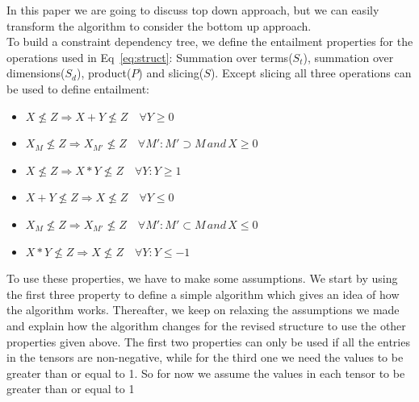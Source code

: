 \documentclass{article}
\begin{document}
In this paper we are going to discuss top down approach, but we can easily transform the algorithm to consider the bottom up approach. 
\\
To build a constraint dependency tree, we define the entailment properties for the operations used in Eq~\ref{eq:struct}: Summation over terms($S_t$), summation over dimensions($S_d$), product($P$) and slicing($S$). Except slicing all three operations can be used to define entailment:
\begin{itemize}
\item $X \not\le Z \Rightarrow X + Y \not\le Z \quad \forall Y \geq 0$
\item $X_{M} \not\le Z \Rightarrow X_{M'} \not\le Z \quad \forall M': M' \supset M \, and \, X \geq 0$
\item $X \not\le Z \Rightarrow X * Y \not\le Z \quad \forall Y: Y \geq 1$
\item $X + Y \not\le Z \Rightarrow X \not\le Z \quad \forall Y \le 0$
\item $X_{M} \not\le Z \Rightarrow X_{M'} \not\le Z \quad \forall M': M' \subset M \, and \, X \le 0$
\item $X * Y \not\le Z \Rightarrow X \not\le Z \quad \forall Y: Y \le -1$
\end{itemize}


To use these properties, we have to make some assumptions. We start by using the first three property to define a simple algorithm which gives an idea of how the algorithm works. Thereafter, we keep on relaxing the assumptions we made and explain how the algorithm changes for the revised structure to use the other properties given above. The first two properties can only be used if all the entries in the tensors are non-negative, while for the third one we need the values to be greater than or equal to 1. So for now we assume the values in each tensor to be greater than or equal to 1
\end{document}
